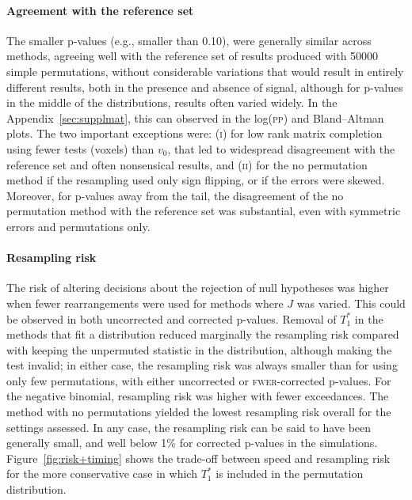 \paragraph{Agreement with the reference set} The smaller p-values (e.g., smaller than 0.10), were generally similar across methods, agreeing well with the reference set of results produced with 50000 simple permutations, without considerable variations that would result in entirely different results, both in the presence and absence of signal, although for p-values in the middle of the distributions, results often varied widely. In the Appendix~\ref{sec:supplmat}, this can observed in the log(\textsc{pp}) and Bland--Altman plots. The two important exceptions were: (\textsc{i}) for low rank matrix completion using fewer tests (voxels) than $v_0$, that led to widespread disagreement with the reference set and often nonsensical results, and (\textsc{ii}) for the no permutation method if the resampling used only sign flipping, or if the errors were skewed. Moreover, for p-values away from the tail, the disagreement of the no permutation method with the reference set was substantial, even with symmetric errors and permutations only.

\paragraph{Resampling risk} The risk of altering decisions about the rejection of null hypotheses was higher when fewer rearrangements were used for methods where $J$ was varied. This could be observed in both uncorrected and corrected p-values. Removal of $T^*_1$ in the methods that fit a distribution reduced marginally the resampling risk compared with keeping the unpermuted statistic in the distribution, although making the test invalid; in either case, the resampling risk was always smaller than for using only few permutations, with either uncorrected or \textsc{fwer}-corrected p-values. For the negative binomial, resampling risk was higher with fewer exceedances. The method with no permutations yielded the lowest resampling risk overall for the settings assessed. In any case, the resampling risk can be said to have been generally small, and well below 1\% for corrected p-values in the simulations. Figure~\ref{fig:risk+timing} shows the trade-off between speed and resampling risk for the more conservative case in which $T^*_1$ is included in the permutation distribution.

